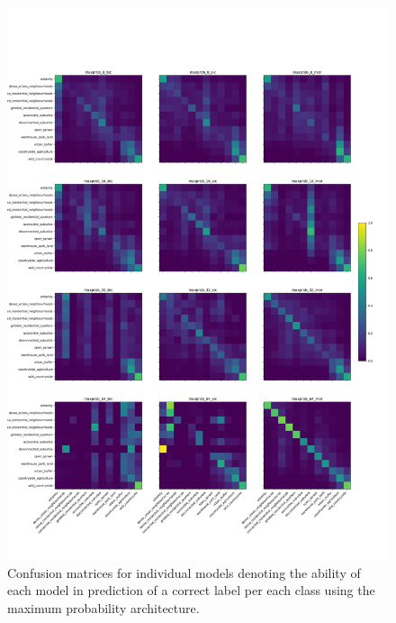 \begin{figure}
    \centering
    \includegraphics[width=.9\linewidth]{fig/maxprob_cm.png}
    \caption{\footnotesize Confusion matrices for individual models denoting
    the ability of each model in prediction of a correct label per each class
    using the maximum probability architecture.}
    \label{fig:maxprob_cm}
\end{figure}


